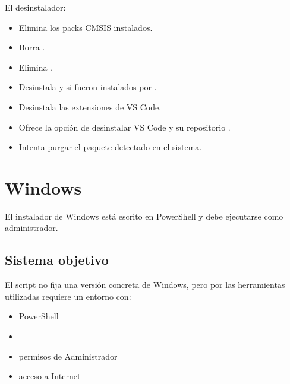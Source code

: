 \documentclass[letterpaper,10pt,english]{sphinxmanual}
\begin{document}
\sphinxAtStartPar
El desinstalador:
\begin{itemize}
\item {} 
\sphinxAtStartPar
Elimina los packs CMSIS instalados.

\item {} 
\sphinxAtStartPar
Borra .

\item {} 
\sphinxAtStartPar
Elimina .

\item {} 
\sphinxAtStartPar
Desinstala  y  si fueron instalados por .

\item {} 
\sphinxAtStartPar
Desinstala las extensiones de VS Code.

\item {} 
\sphinxAtStartPar
Ofrece la opción de desinstalar VS Code y su repositorio .

\item {} 
\sphinxAtStartPar
Intenta purgar el paquete  detectado en el sistema.

\end{itemize}


\section{Windows}
\label{\detokenize{vscode:windows}}
\sphinxAtStartPar
El instalador de Windows está escrito en PowerShell y debe ejecutarse como administrador.


\subsection{Sistema objetivo}
\label{\detokenize{vscode:sistema-objetivo}}
\sphinxAtStartPar
El script no fija una versión concreta de Windows, pero por las herramientas utilizadas requiere un entorno con:
\begin{itemize}
\item {} 
\sphinxAtStartPar
PowerShell

\item {} 
\sphinxAtStartPar
{}

\item {} 
\sphinxAtStartPar
permisos de Administrador

\item {} 
\sphinxAtStartPar
acceso a Internet

\end{itemize}
\end{document}
